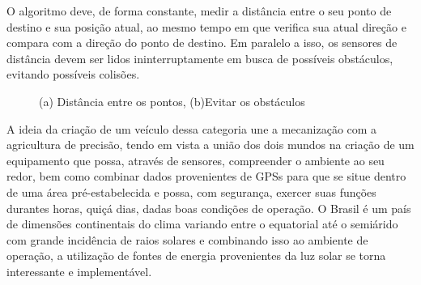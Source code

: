 O algoritmo deve, de forma constante, medir a distância entre o seu ponto de destino e sua posição atual, ao mesmo tempo em que verifica sua atual direção e compara com a direção do ponto de destino. Em paralelo a isso, os sensores de distância devem ser lidos ininterruptamente em busca de possíveis obstáculos, evitando possíveis colisões. 
\begin{figure}[H]
    \begin{center}
      
    \end{center}
    \caption{%
        (a) Distância entre os pontos, (b)Evitar os obstáculos
     }%
\end{figure}



A ideia da criação de um veículo dessa categoria une a mecanização com a agricultura de precisão, tendo em vista a união dos dois mundos na criação de um equipamento que possa, através de sensores, compreender o ambiente ao seu redor, bem como combinar dados provenientes de GPSs para que se situe dentro de uma área pré-estabelecida e possa, com segurança, exercer suas funções durantes horas, quiçá dias, dadas boas condições de operação. O Brasil é um país de dimensões continentais do clima variando entre o equatorial até o semiárido com grande incidência de raios solares e combinando isso ao ambiente de operação, a utilização de fontes de energia provenientes da luz solar se torna interessante e implementável.

